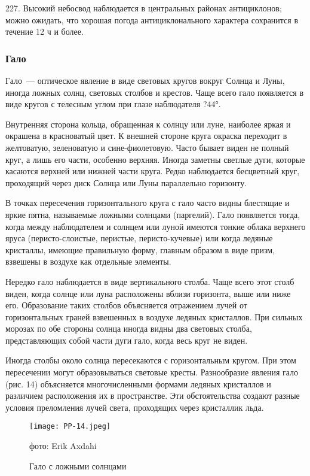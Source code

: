 227. Высокий небосвод наблюдается в центральных районах антициклонов; можно ожидать, что хорошая погода антициклонального характера сохранится в течение 12 ч и более.

\subsubsection{Гало}

Гало~--- оптическое явление в виде световых кругов вокруг Солнца и Луны, иногда ложных солнц, световых столбов и крестов. Чаще всего гало появляется в виде кругов с телесным углом при глазе наблюдателя ?44°.

Внутренняя сторона кольца, обращенная к солнцу или луне, наиболее яркая и окрашена в красноватый цвет. К внешней стороне круга окраска переходит в желтоватую, зеленоватую и сине-фиолетовую. Часто бывает виден не полный круг, а лишь его части, особенно верхняя. Иногда заметны светлые дуги, которые касаются верхней или нижней части круга. Редко наблюдается бесцветный круг, проходящий через диск Солнца или Луны параллельно горизонту.

В точках пересечения горизонтального круга с гало часто видны блестящие и яркие пятна, называемые ложными солнцами (паргелий). Гало появляется тогда, когда между наблюдателем и солнцем или луной имеются тонкие облака верхнего яруса (перисто-слоистые, перистые, перисто-кучевые) или когда ледяные кристаллы, имеющие правильную форму, главным образом в виде призм, взвешены в воздухе как отдельные элементы.

Нередко гало наблюдается в виде вертикального столба. Чаще всего этот столб виден, когда солнце или луна расположены вблизи горизонта, выше или ниже его. Образование таких столбов объясняется отражением лучей от горизонтальных граней взвешенных в воздухе ледяных кристаллов. При сильных морозах по обе стороны солнца иногда видны два световых столба, представляющих собой части дуги гало, когда весь круг не виден.

Иногда столбы около солнца пересекаются с горизонтальным кругом. При этом пересечении могут образовываться световые кресты. Разнообразие явления гало (рис. 14) объясняется многочисленными формами ледяных кристаллов и различием расположения их в пространстве. Эти обстоятельства создают разные условия преломления лучей света, проходящих через кристаллик льда.

\begin{figure}[htb]
  \centering{}
  \texttt{[image: PP-14.jpeg]}
  \caption{Гало с ложными солнцами}
  \label{fig:pp14}
  \small
  \centering{}фото: Erik Axdahi
\end{figure}

